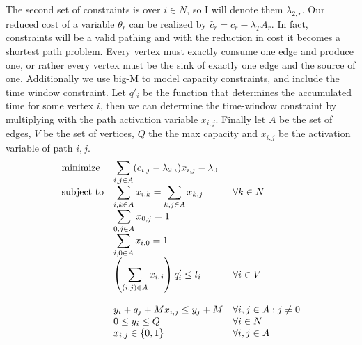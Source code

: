 \documentclass{article}
\begin{document}
    The second set of constraints is over $i \in N$, so I will denote them $\lambda_{2, r}$.
    Our reduced cost of a variable $\theta_r$ can be realized by $\hat{c}_r = c_r - \lambda_T A_r$.
    In fact, constraints will be a valid pathing and with the reduction in cost it becomes a shortest path problem.
    Every vertex must exactly consume one edge and produce one, or rather every vertex must be the sink of exactly one edge and the source of one.
    Additionally we use big-M to model capacity constraints, and include the time window constraint.
    Let $q'_i$ be the function that determines the accumulated time for some vertex $i$, then we can determine the time-window constraint by multiplying with the path activation variable $x_{i,j}$.
    Finally let $A$ be the set of edges, $V$ be the set of vertices, $Q$ the the max capacity and $x_{i,j}$ be the activation variable of path $i,j$.
    \begin{equation*}
        \begin{array}{ll@{}ll}
            \text{minimize}  & \displaystyle\sum_{i,j \in A} ( c_{i, j} - \lambda_{2,i})x_{i,j} - \lambda_0& &\\
            \text{subject to}& \displaystyle\sum_{i, k \in A}x_{i,k} = \sum_{k, j \in A}x_{k,j} &&\forall k \in N\\
            & \displaystyle\sum_{0,j \in A}x_{0,j} = 1 &&\\
            & \displaystyle\sum_{i,0 \in A}x_{i,0} = 1 &&\\
            & \displaystyle \left(\sum_{(i, j) \in A} x_{i,j} \right) q'_{i} \leq l_i && \forall i \in V\\\\
            & \displaystyle y_i + q_j + M x_{i,j} \leq y_j + M & & \forall i,j \in A : j \neq 0\\
            & \displaystyle 0 \leq y_i \leq Q && \forall i \in N \\
            & \displaystyle x_{i,j} \in \{0,1\} && \forall i,j \in A
        \end{array}
    \end{equation*}

    \clearpage
\end{document}
